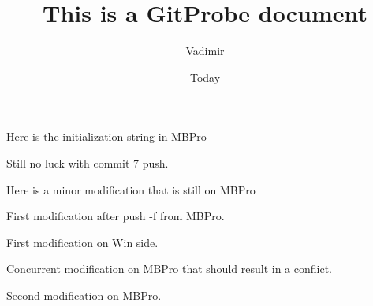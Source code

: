 \documentclass[]{article}
\begin{document}
\title{This is a GitProbe document}
\author{Vadimir}
\date{Today}
\maketitle

Here is the initialization string in MBPro

Still no luck with commit 7 push.

Here is a minor modification that is still on MBPro

First modification after push -f  from MBPro.

First modification on Win side. 

Concurrent modification on MBPro that should result in a conflict.

Second modification on MBPro.
\end{document}
